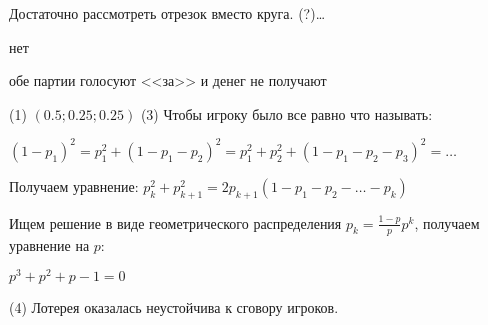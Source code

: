 \begin{solution}{4.23}

\end{solution}
\begin{solution}{4.24}

\end{solution}
\begin{solution}{4.25}

\end{solution}
\begin{solution}{4.26}

\end{solution}
\begin{solution}{4.27}

\end{solution}
\begin{solution}{4.28}

\end{solution}
\begin{solution}{4.29}

Достаточно рассмотреть отрезок вместо круга. (?)\ldots
\end{solution}
\begin{solution}{4.30}

\end{solution}
\begin{solution}{4.31}
нет
\end{solution}
\begin{solution}{4.32}
обе партии голосуют <<за>> и денег не получают
\end{solution}
\begin{solution}{4.33}

\end{solution}
\begin{solution}{4.34}

\end{solution}
\begin{solution}{4.35}

\end{solution}
\begin{solution}{4.36}

\end{solution}
\begin{solution}{4.37}

\end{solution}
\begin{solution}{4.38}
(1)
$(0.5;0.25;0.25)$
(3)
Чтобы игроку было все равно что называть:

$(1-p_1)^2 = p_1^2+(1-p_1-p_2)^2 = p_1^2+p_2^2+(1-p_1-p_2-p_3)^2 =\ldots $

Получаем уравнение:
$p_{k}^{2}+p_{k+1}^{2}=2p_{k+1}(1-p_{1}-p_{2}-\ldots -p_{k})$

Ищем решение в виде геометрического распределения $p_{k}=\frac{1-p}{p}p^{k}$, получаем уравнение на $p$:\par
$p^{3}+p^{2}+p-1=0$ \par

(4)  Лотерея оказалась неустойчива к сговору игроков.
\end{solution}
